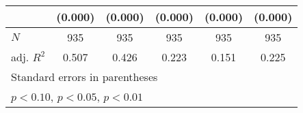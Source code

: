 {\begin{tabular}{l*{5}{c}}
            &     (0.000)         &     (0.000)         &     (0.000)         &     (0.000)         &     (0.000)         \\
\hline
\(N\)       &         935         &         935         &         935         &         935         &         935         \\
adj. \(R^{2}\)&       0.507         &       0.426         &       0.223         &       0.151         &       0.225         \\
\hline\hline
\multicolumn{6}{l}{\footnotesize Standard errors in parentheses}\\
\multicolumn{6}{l}{\footnotesize \sym{*} \(p<0.10\), \sym{**} \(p<0.05\), \sym{***} \(p<0.01\)}\\
\end{tabular}
}

